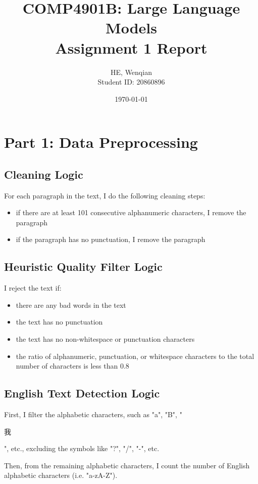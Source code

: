 \documentclass[11pt,a4paper]{article}
\title{
    \textbf{COMP4901B: Large Language Models} \\
    \vspace{0.5em}
    \Large Assignment 1 Report
}
\author{HE, Wenqian \\ Student ID: 20860896}
\date{\today}
\begin{document}
\maketitle


\section{Part 1: Data Preprocessing}

\subsection{Cleaning Logic}

For each paragraph in the text, I do the following cleaning steps:
\begin{itemize}
    \item if there are at least 101 consecutive alphanumeric characters, I remove the paragraph
    \item if the paragraph has no punctuation, I remove the paragraph
\end{itemize}

\subsection{Heuristic Quality Filter Logic}

I reject the text if:

\begin{itemize}
    \item there are any bad words in the text
    \item the text has no punctuation
    \item the text has no non-whitespace or punctuation characters
    \item the ratio of alphanumeric, punctuation, or whitespace characters to the total number of characters is less than 0.8
\end{itemize}

\subsection{English Text Detection Logic}

First, I filter the alphabetic characters, such as "a", "B", "\begin{CJK}{UTF8}{gbsn}我\end{CJK}", etc., excluding the symbols like "?", "/", "-", etc.

Then, from the remaining alphabetic characters, I count the number of English alphabetic characters (i.e. "a-zA-Z").
\end{document}
